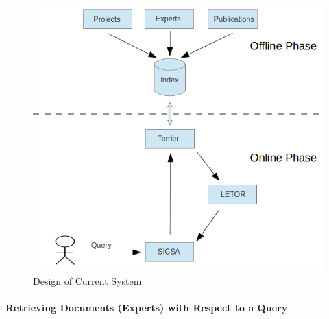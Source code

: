  \begin{figure}
 \centering
 \includegraphics[scale=0.4,keepaspectratio]{./figures/newSystemDesign.png}
 \caption{Design of Current System} \label{fig:newDesign} 
\end{figure}

\paragraph{Retrieving Documents (Experts) with Respect to a Query} \hspace{0pt} \\

